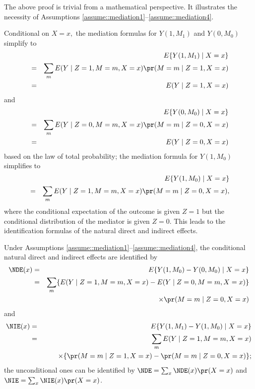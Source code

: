 The above proof is trivial from a mathematical perspective. It illustrates the necessity of Assumptions \ref{assume::mediation1}--\ref{assume::mediation4}. 


Conditional on $X=x,$ the mediation formulas for $Y(1, M_1)$ and $Y(0, M_0)$ simplify to
\begin{eqnarray*}
&& E\{  Y(1, M_1)\mid X=x \} \\ 
&=& \sum_m E( Y  \mid  Z=1, M=m,   X=x) \pr(M=m \mid Z=1, X=x)\\
&=& E( Y  \mid  Z=1 ,  X=x)
\end{eqnarray*}
and
\begin{eqnarray*}
&&E\{  Y(0, M_0)\mid X=x \}  \\
&=& \sum_m E( Y  \mid  Z=0, M=m,   X=x) \pr(M=m \mid Z=0, X=x)\\
&=& E( Y  \mid  Z=0 ,  X=x)
\end{eqnarray*}
based on the law of total probability; the mediation formula for $Y(1, M_0)$ simplifies to
\begin{eqnarray*}
&&E\{  Y(1, M_0)\mid X=x \}  \\
&=&  \sum_m E( Y  \mid  Z=1, M=m,   X=x) \pr(M=m \mid Z=0, X=x),
\end{eqnarray*}
where the conditional expectation of the outcome is given $Z=1$ but the conditional distribution of the mediator is given $Z=0$. 
This leads to the identification formulas of the natural direct and indirect effects.

\begin{corollary}
\label{corollary::mediation-nde-nie}
Under Assumptions \ref{assume::mediation1}--\ref{assume::mediation4}, 
the conditional natural direct and indirect effects are identified by
\begin{eqnarray*}
\NDE(x) &=& E\{ Y(1, M_0) - Y(0, M_0) \mid X=x \} \\
&=& \sum_m \{ E( Y  \mid  Z=1, M=m,   X=x) - E( Y  \mid  Z=0, M=m,   X=x) \} \\
&& \qquad  \times \pr(M=m \mid Z=0, X=x)
\end{eqnarray*}
and
\begin{eqnarray*}
\NIE(x) &=& E\{ Y(1, M_1) - Y(1, M_0) \mid X=x \} \\
&=& \sum_m   E( Y  \mid  Z=1, M=m,   X=x)\\
&&  \qquad  \times  \{ \pr(M=m \mid Z=1, X=x) -  \pr(M=m \mid Z=0, X=x) \};
\end{eqnarray*}
the unconditional ones can be identified by $\NDE = \sum_ x \NDE(x) \pr(X=x)$ and $\NIE = \sum_ x \NIE(x) \pr(X=x)$.
\end{corollary}






